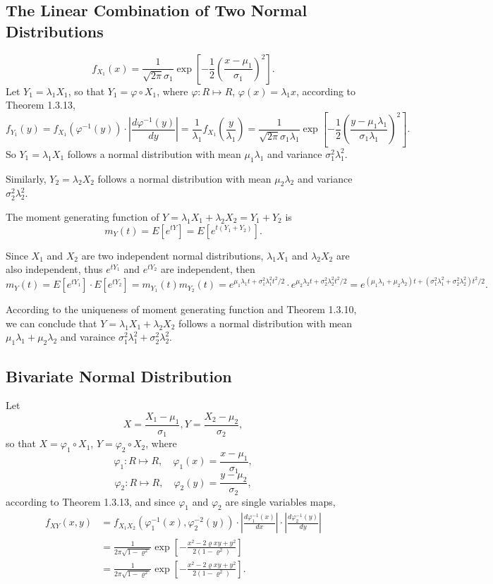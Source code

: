 \documentclass[11pt,a4paper]{article}
\begin{document}
\subsection{The Linear Combination of Two Normal Distributions}

$$f_{X_1}(x)=\frac{1}{\sqrt{2\pi}\sigma_1}\exp\left[-\frac{1}{2}\left(\frac{x-\mu_1}{\sigma_1}\right)^2\right].$$
Let $Y_1=\lambda_1X_1$, so that $Y_1=\varphi\circ X_1$, where $\varphi:R\mapsto R$, $\varphi(x)=\lambda_1 x$, according to Theorem 1.3.13,
$$f_{Y_1}(y)=f_{X_1}(\varphi^{-1}(y))\cdot\left|\frac{d\varphi^{-1}(y)}{dy}\right|=\frac{1}{\lambda_1}f_{X_1}\left(\frac{y}{\lambda_1}\right)=\frac{1}{\sqrt{2\pi}\sigma_1\lambda_1}\exp\left[-\frac{1}{2}\left(\frac{y-\mu_1\lambda_1}{\sigma_1\lambda_1}\right)^2\right].$$
So $Y_1=\lambda_1X_1$ follows a normal distribution with mean $\mu_1\lambda_1$ and variance $\sigma_1^2\lambda_1^2$.

Similarly, $Y_2=\lambda_2X_2$ follows a normal distribution with mean $\mu_2\lambda_2$ and variance $\sigma_2^2\lambda_2^2$.

The moment generating function of $Y=\lambda_1X_1+\lambda_2X_2=Y_1+Y_2$ is
$$m_Y(t)=E[e^{tY}]=E[e^{t(Y_1+Y_2)}].$$

Since $X_1$ and $X_2$ are two independent normal distributions, $\lambda_1X_1$ and $\lambda_2X_2$ are also independent, thus $e^{tY_1}$ and $e^{tY_2}$ are independent, then
$$m_Y(t)=E[e^{tY_1}]\cdot E[e^{tY_2}]=m_{Y_1}(t)m_{Y_2}(t)=e^{\mu_1\lambda_1t+\sigma_1^2\lambda_1^2t^2/2}\cdot e^{\mu_2\lambda_2t+\sigma_2^2\lambda_2^2t^2/2}=e^{(\mu_1\lambda_1+\mu_2\lambda_2)t+(\sigma_1^2\lambda_1^2+\sigma_2^2\lambda_2^2)t^2/2}.$$

According to the uniqueness of moment generating function and Theorem 1.3.10, we can conclude that $Y=\lambda_1X_1+\lambda_2X_2$ follows a normal distribution with mean $\mu_1\lambda_1+\mu_2\lambda_2$ and varaince $\sigma_1^2\lambda_1^2+\sigma_2^2\lambda_2^2$.

\subsection{Bivariate Normal Distribution}
Let
$$X=\frac{X_1-\mu_1}{\sigma_1},Y=\frac{X_2-\mu_2}{\sigma_2},$$
so that $X=\varphi_1\circ X_1$, $Y=\varphi_2\circ X_2$, where 
$$\varphi_1:R\mapsto R,\quad \varphi_1(x)=\frac{x-\mu_1}{\sigma_1},$$
$$\varphi_2:R\mapsto R,\quad \varphi_2(y)=\frac{y-\mu_2}{\sigma_2},$$
according to Theorem 1.3.13, and since $\varphi_1$ and $\varphi_2$ are single variables maps,
\begin{align*}
f_{XY}(x,y)&=f_{X_1X_2}(\varphi_1^{-1}(x),\varphi_2^{-2}(y))\cdot\left|\frac{d\varphi_1^{-1}(x)}{dx}\right|\cdot\left|\frac{d\varphi_2^{-1}(y)}{dy}\right|\\
&=\frac{1}{2\pi\sqrt{1-\varrho^2}}\exp\left[-\frac{x^2-2\varrho xy+y^2}{2(1-\varrho^2)}\right]\\
&=\frac{1}{2\pi\sqrt{1-\varrho^2}}\exp\left[-\frac{x^2-2\varrho xy+y^2}{2(1-\varrho^2)}\right].
\end{align*}
$$$$
\end{document}
